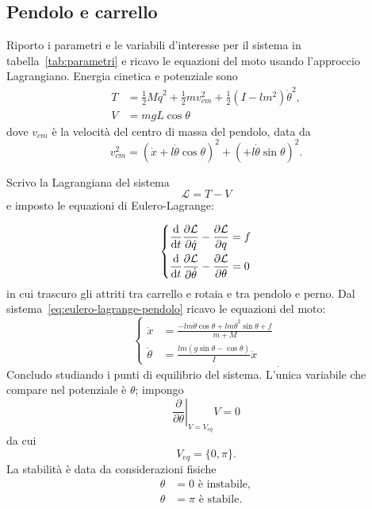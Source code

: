 \subsection{Pendolo e carrello}
Riporto i parametri e le variabili d'interesse per il sistema in 
tabella~\ref{tab:parametri} e ricavo le equazioni del moto
usando l'approccio Lagrangiano.
Energia cinetica e potenziale sono
\begin{align*}
        T &= \frac 1 2 M  \dot q^2 + \frac 1 2 m v_{cm}^2 + \frac 1 2 (I - lm^2)\dot \theta^2, \\ %
        V &= mgL \cos\theta
\end{align*}
dove $v_{cm}$ è la velocità del centro di massa del pendolo, data da
\begin{equation*}
    v^2_{cm} = (\dot x + l \dot \theta \cos \theta)^2 + (+ l \dot \theta \sin \theta)^2.
\end{equation*}




Scrivo la Lagrangiana del sistema
\begin{equation*}
    \mathcal L = T - V
\end{equation*}
e imposto le equazioni di Eulero-Lagrange:

\begin{equation}
        \left\{
        \begin{aligned}
            \totald t \partiald{\dot q} {\mathcal L} - \partiald q {\mathcal L} &= f \\
            \totald t \partiald{\dot \theta} {\mathcal L}  - \partiald \theta {\mathcal L} &= 0
        \end{aligned}
        \right.
        \label{eq:eulero-lagrange-pendolo}
\end{equation}
in cui trascuro gli attriti tra carrello e rotaia e tra
pendolo e perno.
Dal sistema~\eqref{eq:eulero-lagrange-pendolo} ricavo le equazioni del moto:
\begin{equation}
        \left\{
        \begin{aligned}
            \ddot x &= \frac {-lm \ddot \theta \cos \theta + lm \dot \theta^2 \sin \theta + f} {m + M} \\
            \ddot \theta &= \frac {lm (g\sin \theta - \cos \theta) }{I} \ddot x
        \end{aligned}
    \right.
    _.
    \label{eq:moto-sistema}
\end{equation}
Concludo studiando i punti di equilibrio del sistema.
L'unica variabile che compare nel potenziale è $\theta$; impongo
\begin{equation*}
    \left. \frac \partial {\partial \theta}\right |_{V=V_{eq}} V =  0
\end{equation*}
da cui
\begin{equation*}
     V_{eq} = \{0, \pi\}.
\end{equation*}
La stabilità è data da considerazioni fisiche
\begin{align*}
    \theta &= 0  \text{ è instabile}, \\
    \theta &= \pi  \text{ è stabile}.
\end{align*}

